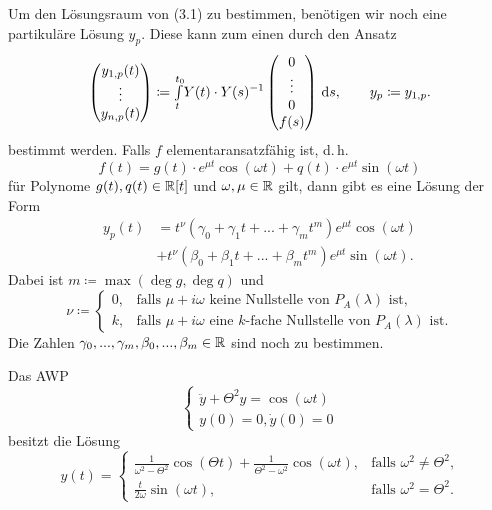 \documentclass{cheat-sheet}
\begin{document}
\begin{bem}
  Um den Lösungsraum von (3.1) zu bestimmen, benötigen wir noch eine partikuläre Lösung $y_p$. Diese kann zum einen durch den Ansatz
  \[
    \begin{pmatrix}
      y_{1,p}(t)\\
      \vdots\\
      y_{n,p}(t)
    \end{pmatrix} \coloneqq {\textstyle \int\limits_{t}^{t_0}} Y(t) \cdot Y(s)^{-1} \begin{pmatrix}
      0\\ \vdots \\ 0 \\ f(s)
    \end{pmatrix} \,\mathrm{d} s, \qquad
    y_p \coloneqq y_{1,p}.
  \]
  bestimmt werden. Falls $f$ elementaransatzfähig ist, d.\,h.
  \[ f(t) = g(t) \cdot e^{\mu t} \cos(\omega t) + q(t) \cdot e^{\mu t} \sin(\omega t) \]
  für Polynome $g(t), q(t) \in \mathbb{R}[t]$ und $\omega, \mu \in \mathbb{R}$ gilt, dann gibt es eine Lösung der Form
  \begin{align*}
    y_p(t) &= t^{\nu} (\gamma_0 + \gamma_1 t + ... + \gamma_m t^m) e^{\mu t} \cos(\omega t)\\
    & + t^{\nu} (\beta_0 + \beta_1 t + ... + \beta_m t^m) e^{\mu t} \sin(\omega t).
  \end{align*}
  Dabei ist $m \coloneqq \max(\deg g, \deg q)$ und
  \[
    \nu \coloneqq \begin{cases}
      0, & \text{falls $\mu + i \omega$ keine Nullstelle von $P_A(\lambda)$ ist,}\\
      k, & \text{falls $\mu + i \omega$ eine $k$-fache Nullstelle von $P_A(\lambda)$ ist}.
    \end{cases}
  \]
  Die Zahlen $\gamma_0, ..., \gamma_m, \beta_0, ..., \beta_m \in \mathbb{R}$ sind noch zu bestimmen.
\end{bem}

\begin{bsp}
  Das AWP
  \[
    \left\{ \begin{array}{ll}
      \ddot{y} + \Theta^2 y = \cos(\omega t)\\
      y(0) = 0, \dot{y}(0) = 0
    \end{array} \right.
  \]
  besitzt die Lösung
  \[
    y(t) = \begin{cases}
      \tfrac{1}{\omega^2 - \Theta^2} \cos(\Theta t) + \tfrac{1}{\Theta^2 - \omega^2} \cos(\omega t), &\text{falls $\omega^2 \not= \Theta^2$,}\\
      \tfrac{t}{2 \omega} \sin(\omega t), &\text{falls $\omega^2 = \Theta^2$.}
    \end{cases}
  \]
\end{bsp}
\end{document}
